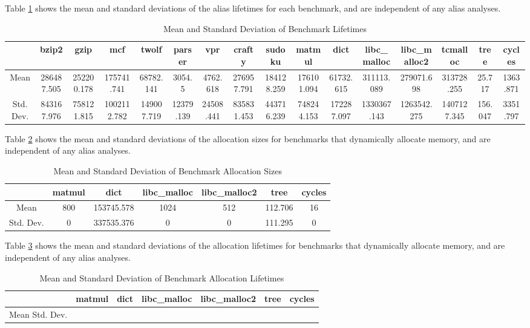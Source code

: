 Table \ref{table:5} shows the mean and standard deviations of the alias lifetimes for each benchmark, and are independent of any alias analyses.

\begin{table}
\centering
   \begin{tabular} {|c|c c c c c c c c c c c c c c c|}
      \hline
      & bzip2 & gzip & mcf & twolf & parser & vpr & crafty & sudoku & matmul & dict & libc_malloc & libc_malloc2 & tcmalloc & tree & cycles \\
      \hline
      Mean & 286487.505 & 252200.178 & 175741.741 & 68782.141 & 3054.5 & 4762.618 & 276957.791 & 184128.259 & 176101.094 & 61732.615 & 311113.089 & 279071.698 & 313728.255 & 25.717 & 1363.871 \\
      \hline
      Std. Dev. & 843167.976 & 758121.815 & 1002112.782 & 149007.719 & 12379.139 & 24508.441 & 835831.453 & 443716.239 & 748244.153 & 172287.097 & 1330367.143 & 1263542.275 & 1407127.345 & 156.047 & 3351.797 \\
      \hline
   \end{tabular}
   \caption{Mean and Standard Deviation of Benchmark Lifetimes}
   \label{table:5}
\end{table}

Table \ref{table:6} shows the mean and standard deviations of the allocation sizes for benchmarks that dynamically allocate memory, and are independent of any alias analyses.

\begin{table}
\centering
   \begin{tabular} {|c|c c c c c c|}
      \hline
      & matmul & dict & libc_malloc & libc_malloc2 & tree & cycles \\
      \hline
      Mean & 800 & 153745.578 & 1024 & 512 & 112.706 & 16 \\
      \hline
      Std. Dev. & 0 & 337535.376 & 0 & 0 & 111.295 & 0 \\
      \hline
   \end{tabular}
   \caption{Mean and Standard Deviation of Benchmark Allocation Sizes}
   \label{table:6}
\end{table}

Table \ref{table:7} shows the mean and standard deviations of the allocation lifetimes for benchmarks that dynamically allocate memory, and are independent of any alias analyses.

\begin{table}
\centering
   \begin{tabular} {|c|c c c c c c|}
      \hline
      & matmul & dict & libc_malloc & libc_malloc2 & tree & cycles \\
      \hline
      Mean
      \hline
      Std. Dev.
      \hline
   \end{tabular}
   \caption{Mean and Standard Deviation of Benchmark Allocation Lifetimes}
   \label{table:7}
\end{table}

